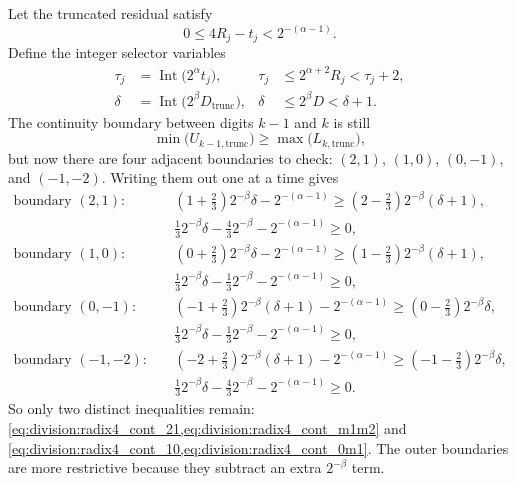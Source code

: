 \documentclass[11pt]{article}
\DeclareMathOperator{\Int}{Int}
\numberwithin{equation}{section}
\begin{document}
Let the truncated residual satisfy
\begin{equation}
  \label{eq:division:radix4_trunc_error}
  0 \le 4R_j - t_j < 2^{-(\alpha-1)}.
\end{equation}
Define the integer selector variables
\begin{align}
  \label{eq:division:radix4_tau_def}
  \tau_j &= \Int\bigl(2^{\alpha}t_j\bigr),
  &
  \tau_j &\le 2^{\alpha+2}R_j < \tau_j+2, \\
  \label{eq:division:radix4_delta_def}
  \delta &= \Int\bigl(2^{\beta}D_{\text{trunc}}\bigr),
  &
  \delta &\le 2^{\beta}D < \delta+1.
\end{align}
The continuity boundary between digits $k-1$ and $k$ is still
\[
  \min\bigl(U_{k-1,\text{trunc}}\bigr) \ge \max\bigl(L_{k,\text{trunc}}\bigr),
\]
but now there are four adjacent boundaries to check: $(2,1)$, $(1,0)$, $(0,-1)$, and $(-1,-2)$.
Writing them out one at a time gives
\begin{align}
  \text{boundary }(2,1):
  &\quad
  \left(1+\frac{2}{3}\right)2^{-\beta}\delta - 2^{-(\alpha-1)}
  \ge
  \left(2-\frac{2}{3}\right)2^{-\beta}(\delta+1),
  \nonumber \\
  &\quad
  \frac{1}{3}2^{-\beta}\delta - \frac{4}{3}2^{-\beta} - 2^{-(\alpha-1)} \ge 0,
  \label{eq:division:radix4_cont_21} \\
  \text{boundary }(1,0):
  &\quad
  \left(0+\frac{2}{3}\right)2^{-\beta}\delta - 2^{-(\alpha-1)}
  \ge
  \left(1-\frac{2}{3}\right)2^{-\beta}(\delta+1),
  \nonumber \\
  &\quad
  \frac{1}{3}2^{-\beta}\delta - \frac{1}{3}2^{-\beta} - 2^{-(\alpha-1)} \ge 0,
  \label{eq:division:radix4_cont_10} \\
  \text{boundary }(0,-1):
  &\quad
  \left(-1+\frac{2}{3}\right)2^{-\beta}(\delta+1) - 2^{-(\alpha-1)}
  \ge
  \left(0-\frac{2}{3}\right)2^{-\beta}\delta,
  \nonumber \\
  &\quad
  \frac{1}{3}2^{-\beta}\delta - \frac{1}{3}2^{-\beta} - 2^{-(\alpha-1)} \ge 0,
  \label{eq:division:radix4_cont_0m1} \\
  \text{boundary }(-1,-2):
  &\quad
  \left(-2+\frac{2}{3}\right)2^{-\beta}(\delta+1) - 2^{-(\alpha-1)}
  \ge
  \left(-1-\frac{2}{3}\right)2^{-\beta}\delta,
  \nonumber \\
  &\quad
  \frac{1}{3}2^{-\beta}\delta - \frac{4}{3}2^{-\beta} - 2^{-(\alpha-1)} \ge 0.
  \label{eq:division:radix4_cont_m1m2}
\end{align}
So only two distinct inequalities remain:
\cref{eq:division:radix4_cont_21,eq:division:radix4_cont_m1m2} and
\cref{eq:division:radix4_cont_10,eq:division:radix4_cont_0m1}.
The outer boundaries are more restrictive because they subtract an extra $2^{-\beta}$ term.
\end{document}
